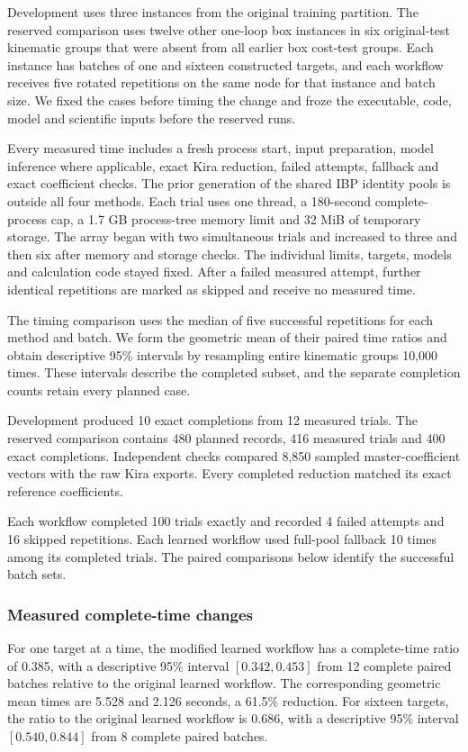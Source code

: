 Development uses three instances from the original training partition.
The reserved comparison uses twelve other one-loop box instances in
six original-test kinematic groups that were absent from all earlier
box cost-test groups. Each instance has batches of one and sixteen
constructed targets, and each workflow receives five rotated repetitions
on the same node for that instance and batch size. We fixed the cases
before timing the change and froze the executable, code, model and
scientific inputs before the reserved runs.

Every measured time includes a fresh process start, input preparation,
model inference where applicable, exact Kira reduction, failed attempts,
fallback and exact coefficient checks. The prior generation of the shared
IBP identity pools is outside all four methods. Each trial uses one thread,
a 180-second complete-process cap, a 1.7 GB process-tree memory limit and
32 MiB of temporary storage. The array began with two simultaneous trials and increased to three
and then six after memory and storage checks. The individual limits,
targets, models and calculation code stayed fixed.
After a failed measured attempt, further identical repetitions are
marked as skipped and receive no measured time.

The timing comparison uses the median of five successful repetitions
for each method and batch. We form the geometric mean of their paired
time ratios and obtain descriptive 95\% intervals by resampling entire
kinematic groups 10,000 times. These intervals describe the completed
subset, and the separate completion counts retain every planned case.

Development produced 10 exact completions from 12 measured trials. The reserved comparison contains 480 planned records, 416 measured trials and 400 exact completions. Independent checks compared 8,850 sampled master-coefficient vectors with the raw Kira exports. Every completed reduction matched its exact reference coefficients.

Each workflow completed 100 trials exactly and recorded 4 failed attempts and 16 skipped repetitions. Each learned workflow used full-pool fallback 10 times among its completed trials. The paired comparisons below identify the successful batch sets.

\subsubsection{Measured complete-time changes}
For one target at a time, the modified learned workflow has a complete-time ratio of 0.385, with a descriptive 95\% interval $[0.342,0.453]$ from 12 complete paired batches relative to the original learned workflow. The corresponding geometric mean times are 5.528 and 2.126 seconds, a 61.5\% reduction. For sixteen targets, the ratio to the original learned workflow is 0.686, with a descriptive 95\% interval $[0.540,0.844]$ from 8 complete paired batches.

